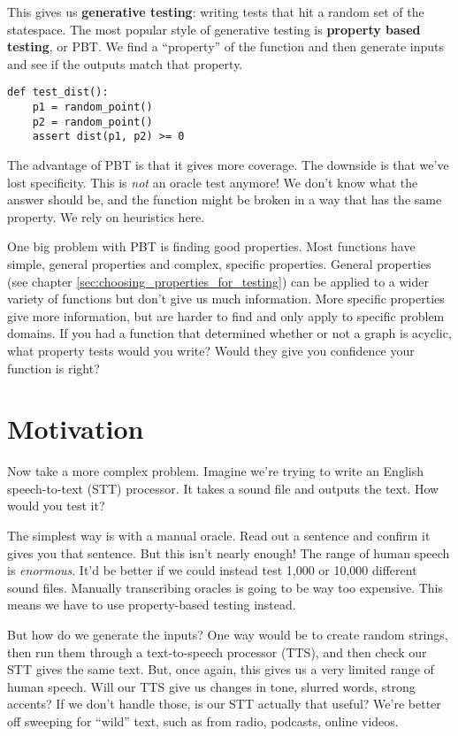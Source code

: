 This gives us \textbf{generative testing}: writing tests that hit a
random set of the statespace. The most popular style of generative
testing is \textbf{property based testing}, or PBT. We find a
``property'' of the function and then generate inputs and see if the
outputs match that property.

\begin{verbatim}
def test_dist():
    p1 = random_point()
    p2 = random_point()
    assert dist(p1, p2) >= 0
\end{verbatim}
The advantage of PBT is that it gives more coverage. The downside is
that we've lost specificity. This is \emph{not} an oracle test anymore!
We don't know what the answer should be, and the function might be
broken in a way that has the same property. We rely on heuristics here.

One big problem with PBT is finding good properties. Most functions have
simple, general properties and complex, specific properties.
General properties (see chapter \ref{sec:choosing_properties_for_testing})
can be applied to a wider variety of functions but don't
give us much information. More specific properties give more
information, but are harder to find and only apply to specific problem
domains. If you had a function that determined whether or not a graph is
acyclic, what property tests would you write? Would they give you
confidence your function is right?

\section{Motivation}
\label{motivation}

Now take a more complex problem. Imagine we're trying to write an
English speech-to-text (STT) processor. It takes a sound file and
outputs the text. How would you test it?

The simplest way is with a manual oracle. Read out a sentence and
confirm it gives you that sentence. But this isn't nearly enough! The
range of human speech is \emph{enormous}. It'd be better if we could
instead test 1,000 or 10,000 different sound files. Manually
transcribing oracles is going to be way too expensive. This means we
have to use property-based testing instead.

But how do we generate the inputs? One way would be to create random
strings, then run them through a text-to-speech processor (TTS), and
then check our STT gives the same text. But, once again, this gives us a
very limited range of human speech. Will our TTS give us changes in
tone, slurred words, strong accents? If we don't handle those, is our
STT actually that useful? We're better off sweeping for ``wild'' text,
such as from radio, podcasts, online videos.

